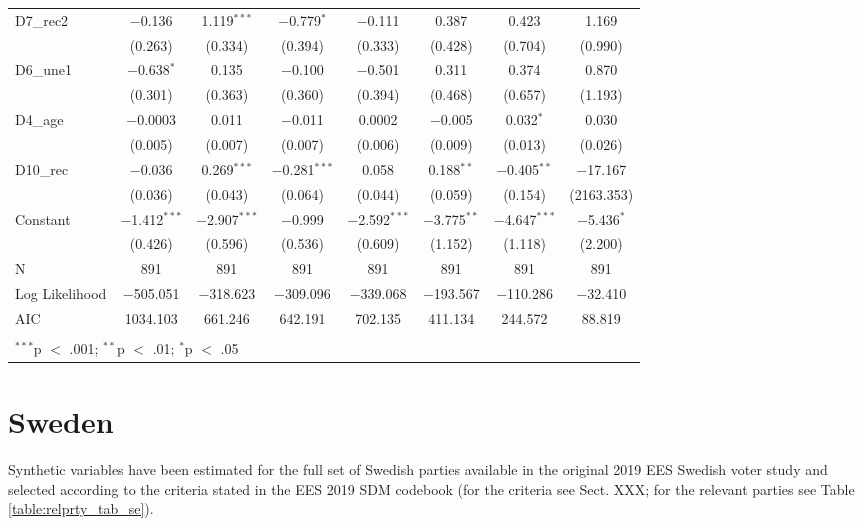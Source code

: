 \documentclass[
]{article}
\begin{document}
\begin{table}[!htbp]
\begin{tabular}{@{\extracolsep{5pt}}lccccccc}
  D7\_rec2 & $-$0.136 & 1.119$^{***}$ & $-$0.779$^{*}$ & $-$0.111 & 0.387 & 0.423 & 1.169 \\ 
  & (0.263) & (0.334) & (0.394) & (0.333) & (0.428) & (0.704) & (0.990) \\ 
  D6\_une1 & $-$0.638$^{*}$ & 0.135 & $-$0.100 & $-$0.501 & 0.311 & 0.374 & 0.870 \\ 
  & (0.301) & (0.363) & (0.360) & (0.394) & (0.468) & (0.657) & (1.193) \\ 
  D4\_age & $-$0.0003 & 0.011 & $-$0.011 & 0.0002 & $-$0.005 & 0.032$^{*}$ & 0.030 \\ 
  & (0.005) & (0.007) & (0.007) & (0.006) & (0.009) & (0.013) & (0.026) \\ 
  D10\_rec & $-$0.036 & 0.269$^{***}$ & $-$0.281$^{***}$ & 0.058 & 0.188$^{**}$ & $-$0.405$^{**}$ & $-$17.167 \\ 
  & (0.036) & (0.043) & (0.064) & (0.044) & (0.059) & (0.154) & (2163.353) \\ 
  Constant & $-$1.412$^{***}$ & $-$2.907$^{***}$ & $-$0.999 & $-$2.592$^{***}$ & $-$3.775$^{**}$ & $-$4.647$^{***}$ & $-$5.436$^{*}$ \\ 
  & (0.426) & (0.596) & (0.536) & (0.609) & (1.152) & (1.118) & (2.200) \\ 
 N & 891 & 891 & 891 & 891 & 891 & 891 & 891 \\ 
Log Likelihood & $-$505.051 & $-$318.623 & $-$309.096 & $-$339.068 & $-$193.567 & $-$110.286 & $-$32.410 \\ 
AIC & 1034.103 & 661.246 & 642.191 & 702.135 & 411.134 & 244.572 & 88.819 \\ 
\hline \\[-1.8ex] 
\multicolumn{8}{l}{$^{***}$p $<$ .001; $^{**}$p $<$ .01; $^{*}$p $<$ .05} \\ 
\end{tabular} 
\end{table}

\clearpage

\newpage

\hypertarget{sweden}{%
\section{Sweden}\label{sweden}}

Synthetic variables have been estimated for the full set of Swedish parties available in the original
2019 EES Swedish voter study and selected according to the criteria stated in the EES 2019 SDM codebook (for the criteria see Sect. XXX; for the relevant parties see Table \ref{table:relprty_tab_se}).
\end{document}
